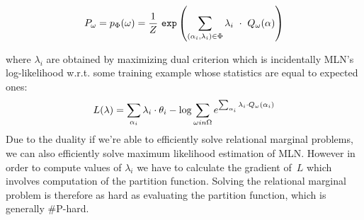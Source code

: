 $$ P_\omega = p_{\Phi}(\omega) = {{1}\over{Z}} ~ {\tt exp}\left( {\sum_{(\alpha_i, \lambda_i) \in \Phi} {\lambda_i ~\cdot~ Q_\omega(\alpha) }} \right)  $$

where $\lambda_i$ are obtained by maximizing dual criterion which is incidentally MLN's log-likelihood w.r.t. some training example whose statistics are equal to expected ones:
$$ L(\lambda) = \sum_{\alpha_i} \lambda_i \cdot \theta_i - {\rm log} \sum_{\omega in \Omega} 
e ^ {\sum_{\alpha_i} \lambda_i \cdot Q_\omega(\alpha_i)}$$
Due to the duality if we're able to efficiently solve relational marginal problems, we can also efficiently solve maximum likelihood estimation of MLN. However in order to compute values of $\lambda_i$ we have to calculate the gradient of~$L$ which involves computation of the partition function. Solving the relational marginal problem is therefore as hard as evaluating the partition function, which is generally \#P-hard.

